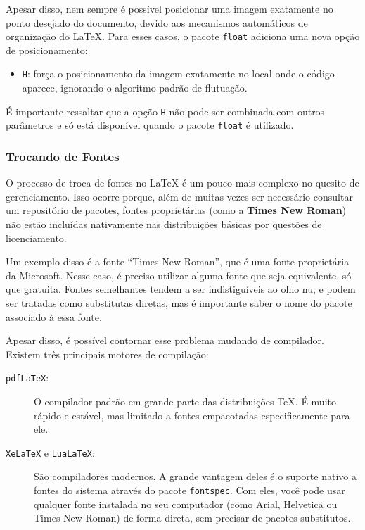 \documentclass{article}
\begin{document}
Apesar disso, nem sempre é possível posicionar uma imagem exatamente no ponto desejado do documento, devido aos mecanismos automáticos de organização do \LaTeX. Para esses casos, o pacote \texttt{float} adiciona uma nova opção de posicionamento:


\begin{itemize}
	\item \texttt{H}: força o posicionamento da imagem exatamente no local onde o código aparece, ignorando o algoritmo padrão de flutuação.
\end{itemize}

É importante ressaltar que a opção \texttt{H} não pode ser combinada com outros parâmetros e só está disponível quando o pacote \texttt{float} é utilizado.


\subsubsection{Trocando de Fontes}
O processo de troca de fontes no \LaTeX\hspace{1pt} é um pouco mais complexo no quesito de gerenciamento. Isso ocorre porque, além de muitas vezes ser necessário consultar um repositório de pacotes, fontes proprietárias (como a \textbf{Times New Roman}) não estão incluídas nativamente nas distribuições básicas por questões de licenciamento.

Um exemplo disso é a fonte ``Times New Roman'', que é uma fonte proprietária da Microsoft. Nesse caso, é preciso utilizar alguma fonte que seja equivalente, só que gratuita. Fontes semelhantes tendem a ser indistiguíveis ao olho nu, e podem ser tratadas como substitutas diretas, mas é importante saber o nome do pacote associado à essa fonte.

Apesar disso, é possível contornar esse problema mudando de compilador. Existem três principais motores de compilação:

\begin{description}
	\item[\texttt{pdfLaTeX}:] O compilador padrão em grande parte das distribuições \TeX. É muito rápido e estável, mas limitado a fontes empacotadas especificamente para ele.
	\item[\texttt{XeLaTeX} e \texttt{LuaLaTeX}:] São compiladores modernos. A grande vantagem deles é o suporte nativo a fontes do sistema através do pacote \texttt{fontspec}. Com eles, você pode usar qualquer fonte instalada no seu computador (como Arial, Helvetica ou Times New Roman) de forma direta, sem precisar de pacotes substitutos.
\end{description}
\end{document}

